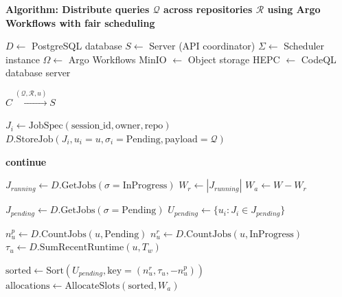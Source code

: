 \documentclass[11pt]{article}
\begin{document}
\noindent\textbf{Algorithm: Distribute queries $\mathcal{Q}$ across repositories $\mathcal{R}$
    using Argo Workflows with fair scheduling}

\begin{algorithmic}[1]

      \State {}
      \State $D \gets$ PostgreSQL database
      \State $S \gets$ Server (API coordinator)
      \State $\Sigma \gets$ Scheduler instance
      \State $\Omega \gets$ Argo Workflows
      \State MinIO $\gets$ Object storage
      \State HEPC $\gets$ CodeQL database server

      \State {}
      \State $C \xrightarrow{(\mathcal{Q}, \mathcal{R}, u)} S$

      \State {}
        \State $J_i \gets \text{JobSpec}(\text{session\_id}, \text{owner}, \text{repo})$
        \State $D.\text{StoreJob}(J_i, u_i=u, \sigma_i=\text{Pending}, \text{payload}=\mathcal{Q})$
      \EndFor

      \State {}
        \State {}
          \State \textbf{continue}
        \EndIf

        \State {}
        \State $J_{running} \gets D.\text{GetJobs}(\sigma=\text{InProgress})$
        \State $W_r \gets |J_{running}|$
        \State $W_a \gets W - W_r$

          \State {}
          \State $J_{pending} \gets D.\text{GetJobs}(\sigma=\text{Pending})$
          \State $U_{pending} \gets \{u_i : J_i \in J_{pending}\}$

            \State $n_u^p \gets D.\text{CountJobs}(u, \text{Pending})$
            \State $n_u^r \gets D.\text{CountJobs}(u, \text{InProgress})$
            \State $\tau_u \gets D.\text{SumRecentRuntime}(u, T_w)$
          \EndFor

          \State $\text{sorted} \gets \text{Sort}(U_{pending}, \text{key}=(n_u^r, \tau_u, -n_u^p))$
          \State $\text{allocations} \gets \text{AllocateSlots}(\text{sorted}, W_a)$


\end{algorithmic}
\end{document}
